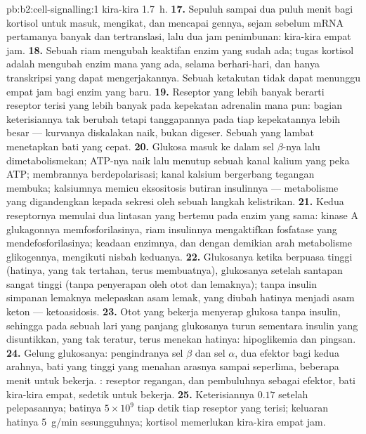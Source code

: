 \begin{solution}{pb:b2:cell-signalling:1}
kira-kira \qty{1.7}{h}.
\textbf{17.} Sepuluh sampai dua puluh menit bagi kortisol untuk masuk,
mengikat, dan mencapai gennya, sejam sebelum mRNA pertamanya banyak dan
tertranslasi, lalu dua jam penimbunan: kira-kira empat jam.
\textbf{18.} Sebuah riam mengubah keaktifan enzim yang sudah ada;
tugas kortisol adalah mengubah enzim mana yang ada, selama
berhari-hari, dan hanya transkripsi yang dapat mengerjakannya. Sebuah
ketakutan tidak dapat menunggu empat jam bagi enzim yang baru.
\textbf{19.} Reseptor yang lebih banyak berarti reseptor terisi yang
lebih banyak pada kepekatan adrenalin mana pun: bagian keterisiannya
tak berubah tetapi tanggapannya pada tiap kepekatannya lebih besar ---
kurvanya diskalakan naik, bukan digeser. Sebuah  yang lambat
menetapkan bati  yang cepat.
\textbf{20.} Glukosa masuk ke dalam sel $\beta$-nya lalu
dimetabolismekan; ATP-nya naik lalu menutup sebuah kanal kalium yang
peka ATP; membrannya berdepolarisasi; kanal kalsium bergerbang tegangan
membuka; kalsiumnya memicu eksositosis butiran insulinnya ---
metabolisme yang digandengkan kepada sekresi oleh sebuah langkah
kelistrikan.
\textbf{21.} Kedua reseptornya memulai dua lintasan yang bertemu pada
enzim yang sama: kinase A glukagonnya memfosforilasinya, riam insulinnya
mengaktifkan fosfatase yang mendefosforilasinya; keadaan enzimnya, dan
dengan demikian arah metabolisme glikogennya, mengikuti nisbah
keduanya.
\textbf{22.} Glukosanya ketika berpuasa tinggi (hatinya, yang tak
tertahan, terus membuatnya), glukosanya setelah santapan sangat tinggi
(tanpa penyerapan oleh otot dan lemaknya); tanpa insulin simpanan
lemaknya melepaskan asam lemak, yang diubah hatinya menjadi asam keton
--- ketoasidosis.
\textbf{23.} Otot yang bekerja menyerap glukosa tanpa insulin,
sehingga pada sebuah lari yang panjang glukosanya turun sementara
insulin yang disuntikkan, yang tak teratur, terus menekan hatinya:
hipoglikemia dan pingsan.
\textbf{24.} Gelung glukosanya: pengindranya sel $\beta$ dan sel
$\alpha$, dua  efektor bagi kedua arahnya, bati yang tinggi yang
menahan arasnya sampai seperlima, beberapa menit untuk bekerja.
: reseptor regangan,  dan pembuluhnya sebagai
efektor, bati kira-kira empat, sedetik untuk bekerja.
\textbf{25.} Keterisiannya $0.17$ setelah pelepasannya; batinya $5\times 10^{9}$ tiap detik
tiap reseptor yang terisi; keluaran hatinya \qty{5}{g/min}
sesungguhnya; kortisol memerlukan kira-kira empat jam.
\end{solution}
